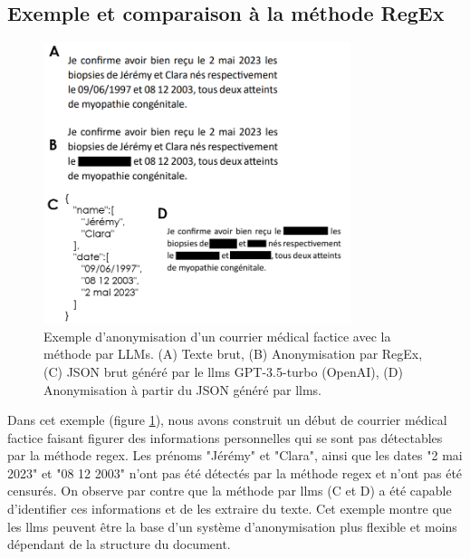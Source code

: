 \subsection{Exemple et comparaison à la méthode RegEx}
\begin{figure}[!ht]
 \centering
 \includegraphics[width=0.8\textwidth]{figures/llms_anonym.png}
 \caption[Exemple anonymisation LLMs]{Exemple d'anonymisation d'un courrier médical factice avec la méthode par LLMs. (A) Texte brut, (B) Anonymisation par RegEx, (C) JSON brut généré par le \gls{llms} GPT-3.5-turbo (OpenAI), (D) Anonymisation à partir du JSON généré par \gls{llms}.}
 \label{fig:llms_anonym}
\end{figure}

Dans cet exemple (figure \ref{fig:llms_anonym}), nous avons construit un début de courrier médical factice faisant figurer des informations personnelles qui se sont pas détectables par la méthode \gls{regex}. Les prénoms "Jérémy" et "Clara", ainsi que les dates "2 mai 2023" et "08 12 2003" n'ont pas été détectés par la méthode \gls{regex} et n'ont pas été censurés. On observe par contre que la méthode par \gls{llms} (C et D) a été capable d'identifier ces informations et de les extraire du texte. Cet exemple montre que les \gls{llms} peuvent être la base d'un système d'anonymisation plus flexible et moins dépendant de la structure du document.

